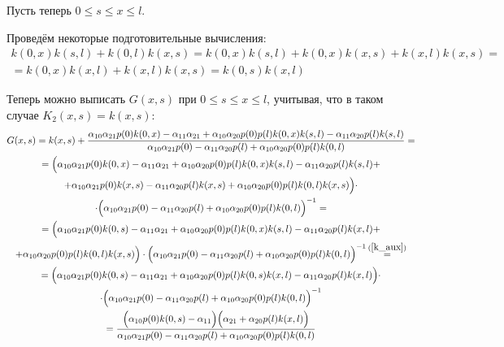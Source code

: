\documentclass[a4paper,12pt]{article} %
\begin{document}
Пусть теперь $0 \leq s\leq x \leq l$.

Проведём некоторые подготовительные вычисления:
\begin{multline}\label{k_aux}
	k(0, x) k(s, l) + k(0, l) k(x, s)
	=
	k(0, x)k(s, l) + k(0, x) k(x, s) + k(x, l) k(x, s)
	=
	\\=
	k(0, x) k(x, l) + k(x, l) k(x, s)
	=
	k(0, s) k(x, l)
\end{multline}

Теперь можно выписать $G(x,s)$ при $0 \leq s\leq x \leq l$,
учитывая, что в таком случае $K_2(x,s) = k(x,s)$:
\begin{multline}
	G(x,s)
	=
	k(x,s)
	+
	\frac{
		  \alpha_{10} \alpha_{21} p(0) k(0, x)
		- \alpha_{11} \alpha_{21}
		+ \alpha_{10} \alpha_{20} p(0) p(l) k(0, x) k(s, l)
		- \alpha_{11} \alpha_{20} p(l) k(s,l)
	}{
		\alpha_{10}\alpha_{21}p(0)  - \alpha_{11}\alpha_{20}p(l) + \alpha_{10}\alpha_{20} p(0) p(l) k(0,l)
	}
	=
	\\=
	\Bigl(
		  \alpha_{10} \alpha_{21} p(0) k(0, x)
		- \alpha_{11} \alpha_{21}
		+ \alpha_{10} \alpha_{20} p(0) p(l) k(0, x) k(s, l)
		- \alpha_{11} \alpha_{20} p(l) k(s, l)
		+ \\
		+ \alpha_{10} \alpha_{21} p(0) k(x, s)
		- \alpha_{11} \alpha_{20} p(l) k(x, s)
		+ \alpha_{10} \alpha_{20} p(0) p(l) k(0,l) k(x,s)
	\Bigr)\cdot \\ \cdot \Bigl(
		\alpha_{10}\alpha_{21}p(0)  - \alpha_{11}\alpha_{20}p(l) + \alpha_{10}\alpha_{20} p(0) p(l) k(0,l)
	\Bigr)^{-1}
	=
	\\=
	\Bigl(
		  \alpha_{10} \alpha_{21} p(0) k(0, s)
		- \alpha_{11} \alpha_{21}
		+ \alpha_{10} \alpha_{20} p(0) p(l) k(0, x) k(s, l)
		- \alpha_{11} \alpha_{20} p(l) k(x, l)
		+ \\
		+ \alpha_{10} \alpha_{20} p(0) p(l) k(0, l) k(x, s)
	\Bigr)\cdot \Bigl(
		\alpha_{10}\alpha_{21}p(0)  - \alpha_{11}\alpha_{20}p(l) + \alpha_{10}\alpha_{20} p(0) p(l) k(0,l)
	\Bigr)^{-1}
	\mathop{=}^{(\ref{k_aux})}
	\\=
	\Bigl(
		  \alpha_{10} \alpha_{21} p(0) k(0, s)
		- \alpha_{11} \alpha_{21}
		+ \alpha_{10} \alpha_{20} p(0) p(l) k(0, s) k(x, l)
		- \alpha_{11} \alpha_{20} p(l) k(x, l)
	\Bigr)\cdot \\ \cdot \Bigl(
		\alpha_{10}\alpha_{21}p(0)  - \alpha_{11}\alpha_{20}p(l) + \alpha_{10}\alpha_{20} p(0) p(l) k(0,l)
	\Bigr)^{-1}
	\\=
	\frac{
		  \Bigl(\alpha_{10} p(0) k(0, s)- \alpha_{11}\Bigr) \Bigl(\alpha_{21} + \alpha_{20} p(l) k(x, l)\Bigr)
	}{
		\alpha_{10}\alpha_{21}p(0)  - \alpha_{11}\alpha_{20}p(l) + \alpha_{10}\alpha_{20} p(0) p(l) k(0,l)
	}
\end{multline}
\end{document}
